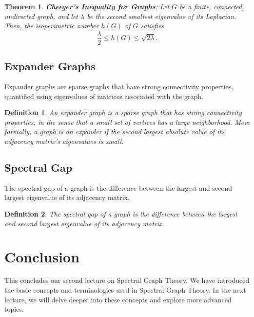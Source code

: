 \documentclass{article}
\newtheorem{definition}{Definition}
\newtheorem{theorem}{Theorem}
\begin{document}
\begin{theorem}
	\textbf{Cheeger's Inequality for Graphs}: Let \(G\) be a finite, connected, undirected graph, and let \(\lambda\) be the second smallest eigenvalue of its Laplacian. Then, the isoperimetric number \(h(G)\) of \(G\) satisfies
	\[
	\frac{\lambda}{2} \leq h(G) \leq \sqrt{2 \lambda}.
	\]
\end{theorem}

\subsection{Expander Graphs}
Expander graphs are sparse graphs that have strong connectivity properties, quantified using eigenvalues of matrices associated with the graph.

\begin{definition}
	An \textit{expander graph} is a sparse graph that has strong connectivity properties, in the sense that a small set of vertices has a large neighborhood. More formally, a graph is an expander if the second largest absolute value of its adjacency matrix's eigenvalues is small.
\end{definition}

\subsection{Spectral Gap}
The spectral gap of a graph is the difference between the largest and second largest eigenvalue of its adjacency matrix.

\begin{definition}
	The \textit{spectral gap} of a graph is the difference between the largest and second largest eigenvalue of its adjacency matrix.
\end{definition}

\section{Conclusion}
This concludes our second lecture on Spectral Graph Theory. We have introduced the basic concepts and terminologies used in Spectral Graph Theory. In the next lecture, we will delve deeper into these concepts and explore more advanced topics.
\end{document}
